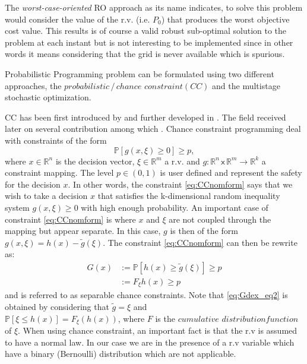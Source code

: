 \documentclass{ifacconf}
\begin{document}
The \textit{worst-case-oriented} RO approach as its name indicates, to solve this problem would consider the value of the r.v. (i.e. $P_0$) that produces the worst objective cost value. This results is of course a valid robust sub-optimal solution to the problem at each instant but is not interesting to be implemented since in other words it means considering that the grid is never available which is spurious.
 
 Probabilistic Programming problem can be formulated using two different approaches, the $probabilistic\,/\,chance$  $constraint (CC)$ and  the multistage stochastic optimization.
  
 CC has been first introduced by \cite{AChWCo1958} and further developed in \cite{AChWCo1959,AChWCo1962,AchWCo1963}. The field received later on several contribution among which \cite{AnPre1970,Tsentai1988,APrBVi1998,RHenrion2002,RHenrion2007}. 
 Chance constraint programming deal with constraints of the form
 \begin{equation}\label{eq:CCnomform}
     \mathbb{P}[g(x,\xi)\geq 0]\geq p,
 \end{equation}
 where $x \in \mathbb{R}^n$ is the decision vector, $\xi \in \mathbb{R}^m$ a r.v. and  $g: \mathbb{R}^n \mathsf{\,x\,}\mathbb{R}^m \rightarrow \mathbb{R}^k$ a constraint mapping. The level $p \in (0,1)$ is user defined and represent the safety for the decision $x$. In other words, the constraint \eqref{eq:CCnomform} says that we wish to take a decision $x$ that satisfies the k-dimensional random inequality system $g(x,\xi)\geq 0 $ with high enough probability. An important case of constraint \eqref{eq:CCnomform} is where  $x$ and $\xi$ are not coupled through the mapping but appear separate. In this case, $g$ is then of the form $g(x,\xi) = h(x)− \widetilde{g}(\xi)$. The constraint \eqref{eq:CCnomform} can then be rewrite as:
 \begin{align}
     G(x)&:= \mathbb{P}[h(x) \geq \widetilde{g}(\xi)]\geq p \label{eq:Gdex_eq1}\\
         &:= F_\xi{h(x)}\geq p \label{eq:Gdex_eq2}
 \end{align}
 and is referred to as separable chance constraints. Note that \eqref{eq:Gdex_eq2} is \;\; obtained \; by \; considering  \;that \; $\widetilde{g} = \xi$ and \\  $\mathbb{P}[\xi \leq h(x)] = F_\xi(h(x))$, where $F$ is the $ cumulative$  $distribution function$ of $\xi$.
 When using chance constraint, an important fact is that the r.v  is assumed to have a normal law. In our case we are in the presence of a r.v variable which have a binary (Bernoulli) distribution which are not applicable.
\end{document}
